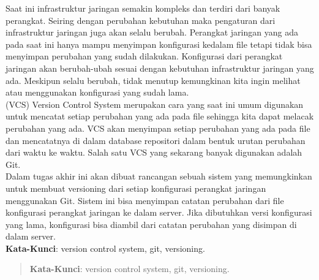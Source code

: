 \begin{abstrak}
        Saat ini infrastruktur jaringan semakin kompleks dan terdiri dari banyak perangkat. Seiring dengan perubahan kebutuhan maka pengaturan dari infrastruktur jaringan juga akan selalu berubah. Perangkat jaringan yang ada pada saat ini hanya mampu menyimpan konfigurasi kedalam file tetapi tidak bisa menyimpan perubahan yang sudah dilakukan. Konfigurasi dari perangkat jaringan akan berubah-ubah sesuai dengan kebutuhan infrastruktur jaringan yang ada. Meskipun selalu berubah, tidak menutup kemungkinan kita ingin melihat atau menggunakan konfigurasi yang sudah lama.\\
		\indent (VCS) Version Control System  merupakan cara yang saat ini umum digunakan untuk mencatat setiap perubahan yang ada pada file sehingga kita dapat melacak perubahan yang ada. VCS akan menyimpan setiap perubahan yang ada pada file dan mencatatnya di dalam database repositori dalam bentuk urutan perubahan dari waktu ke waktu. Salah satu VCS yang sekarang banyak digunakan adalah Git.\\
		\indent Dalam tugas akhir ini akan dibuat rancangan sebuah sistem yang memungkinkan untuk membuat versioning dari setiap konfigurasi perangkat jaringan menggunakan Git. Sistem ini bisa menyimpan catatan perubahan dari file konfigurasi perangkat jaringan ke dalam server. Jika dibutuhkan versi konfigurasi yang lama, konfigurasi bisa diambil dari catatan perubahan yang disimpan di dalam server.\\

	\noindent \textbf{Kata-Kunci}: version control system, git, versioning.
\end{abstrak}
\newpage
\begin{abstract}
	

	\noindent \textbf{Kata-Kunci}: version control system, git, versioning.
\end{abstract}